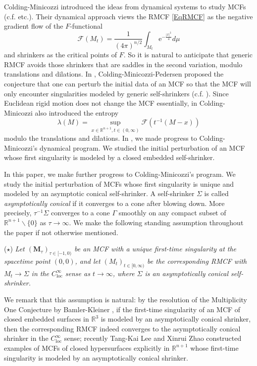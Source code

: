 \documentclass[12pt]{amsart}
\numberwithin{equation}{section}
\numberwithin{equation}{section}
\newcommand{\cF}{\mathcal{F}}
\newcommand{\R}{\mathbb{R}}
\DeclareMathOperator{\loc}{loc}
\begin{document}
	
	Colding-Minicozzi introduced the ideas from dynamical systems to study MCFs (c.f. \cite{CM1,CM2,CM3,CM4} etc.). Their dynamical approach views the RMCF \eqref{EqRMCF} as the negative gradient flow of the $F$-functional
	$$\cF(M_t)=\frac{1}{(4\pi)^{n/2}}\int_{M_t}\mathrm{e}^{-\frac{|x|^2}{4}}d\mu $$
	and shrinkers as the critical points of $F$.  So it is natural to anticipate that generic RMCF avoids those shrinkers that are saddles in the second variation, modulo translations and dilations.  In \cite{CMP}, Colding-Minicozzi-Pedersen proposed the conjecture that one can perturb the initial data of an MCF so that the MCF will only encounter singularities modeled by generic self-shrinkers (c.f. \cite[Conjecture 8.2]{CMP}).
	Since Euclidean rigid motion does not change the MCF essentially, in \cite{CM1} Colding-Minicozzi also introduced the entropy  $$\lambda(M)=\sup_{x\in\R^{n+1},t\in(0,\infty)}\cF(t^{-1}(M-x))$$ modulo the translations and dilations. 
	In \cite{SX}, we made progress to Colding-Minicozzi's dynamical program. We studied the initial perturbation of an MCF whose first singularity is modeled by a closed embedded self-shrinker. 
	
	In this paper, we make further progress to Colding-Minicozzi's program. We study the initial perturbation of MCFs whose first singularity is unique and modeled by an asymptotic conical self-shrinker. A self-shrinker $\Sigma$ is called \emph{asymptotically conical} if it converges to a cone after blowing down. More precisely, $\tau^{-1}\Sigma$ converges to a cone $\Gamma$ smoothly on any compact subset of $\R^{n+1}\backslash\{0\}$ as $\tau\to\infty$. We make the following standing assumption throughout the paper if not otherwise mentioned. 
	
	($\star$) {\it Let $(\mathbf M_\tau)_{\tau\in[-1,0)}$ be an MCF with a unique first-time singularity at the spacetime point $(0,0)$, and let $(M_t)_{t\in[0,\infty)}$ be the corresponding RMCF with $M_t\to\Sigma$ in the $C^\infty_{\loc}$ sense as $t\to\infty$, where $\Sigma$ is an asymptotically conical self-shrinker.}
	
	We remark that this assumption is natural: by the resolution of the Multiplicity One Conjecture by Bamler-Kleiner \cite{BK}, if the first-time singularity of an MCF of closed embedded surfaces in $\R^3$ is modeled by an asymptotically conical shrinker, then the corresponding RMCF indeed converges to the asymptotically conical shrinker in the $C_{\text{loc}}^\infty$ sense; recently Tang-Kai Lee and Xinrui Zhao \cite{LeZh} constructed examples of MCFs of closed hypersurfaces explicitly in $\R^{n+1}$ whose first-time singularity is modeled by an asymptotically conical shrinker.
	
\end{document}
